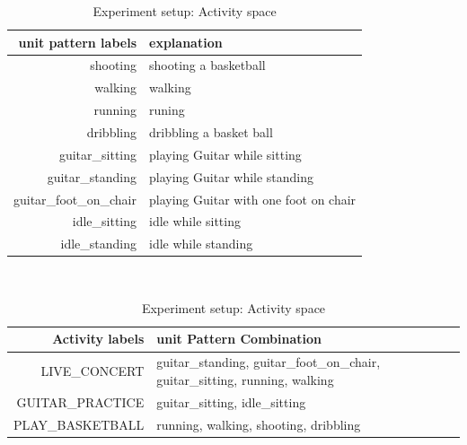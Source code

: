 \documentclass[a4paper, 10pt, conference]{IEEEtran}      %
\begin{document}
\begin{table}[htb]

\begin{tabular}{|r|l|}
  \hline

  \hline 
  \textbf{unit pattern labels} & \textbf{explanation} \\
  \hline
  \hline
    shooting & shooting a basketball \\
  \hline
    walking & walking \\
    \hline
    running & runing \\
   \hline
    dribbling & dribbling a basket ball \\
    \hline
    guitar\_sitting & playing Guitar while sitting  \\
    \hline
    guitar\_standing & playing Guitar while standing  \\
    \hline
    guitar\_foot\_on\_chair & playing Guitar with one foot on chair  \\
    \hline
    idle\_sitting & idle while sitting \\
    \hline
    idle\_standing & idle while standing \\
  \hline
\end{tabular}
\\
\caption{Experiment setup: Unit pattern space}

\begin{tabular}{|r|p{4.5cm}|}
  \hline

  \hline 
  \textbf{Activity labels} & \textbf{unit Pattern Combination} \\
  \hline
  \hline
    LIVE\_CONCERT & guitar\_standing,   guitar\_foot\_on\_chair, 		guitar\_sitting, running, walking  \\
  \hline
    GUITAR\_PRACTICE & guitar\_sitting, idle\_sitting \\
    \hline
    PLAY\_BASKETBALL & running, walking, shooting, dribbling \\

    \hline
    
 \end{tabular}
 \\
 \caption{Experiment setup: Activity space}   

\end{table}
\end{document}
